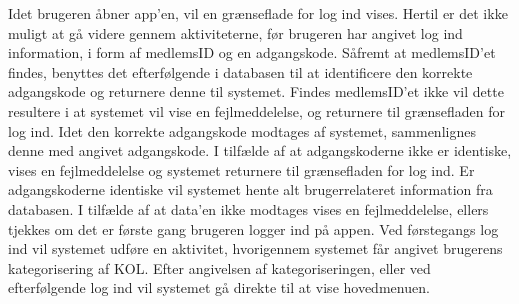 \noindent
Idet brugeren åbner app'en, vil en grænseflade for log ind vises. Hertil er det ikke muligt at gå videre gennem aktiviteterne, før brugeren har angivet log ind information, i form af medlemsID og en adgangskode. 
Såfremt at medlemsID'et findes, benyttes det efterfølgende i databasen til at identificere den korrekte adgangskode og returnere denne til systemet. Findes medlemsID'et ikke vil dette resultere i at systemet vil vise en fejlmeddelelse, og returnere til grænsefladen for log ind. 
Idet den korrekte adgangskode modtages af systemet, sammenlignes denne med angivet adgangskode. I tilfælde af at adgangskoderne ikke er identiske, vises en fejlmeddelelse og systemet returnere til grænsefladen for log ind. Er adgangskoderne identiske vil systemet hente alt brugerrelateret information fra databasen. I tilfælde af at data'en ikke modtages vises en fejlmeddelelse, ellers tjekkes om det er første gang brugeren logger ind på appen. 
Ved førstegangs log ind vil systemet udføre en aktivitet, hvorigennem systemet får angivet brugerens kategorisering af KOL. Efter angivelsen af kategoriseringen, eller ved efterfølgende log ind vil systemet gå direkte til at vise hovedmenuen.  
    

